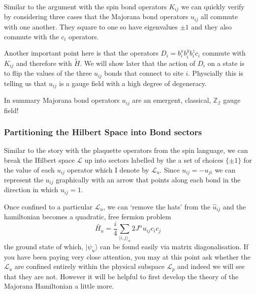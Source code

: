 Similar to the argument with the spin bond operators \(K_{ij}\) we can
quickly verify by considering three cases that the Majorana bond
operators \(u_{ij}\) all commute with one another. They square to one so
have eigenvalues \(\pm 1\) and they also commute with the \(c_i\)
operators.

Another important point here is that the operators
\(D_i = b^x_i b^y_i b^z_i c_i\) commute with \(K_{ij}\) and therefore
with \(\tilde{H}\). We will show later that the action of \(D_i\) on a
state is to flip the values of the three \(u_{ij}\) bonds that connect
to site \(i\). Physcially this is telling us that \(u_{ij}\) is a gauge
field with a high degree of degeneracy.

In summary Majorana bond operators \(u_{ij}\) are an emergent,
classical, \(\mathbb{Z_2}\) gauge field!

\hypertarget{partitioning-the-hilbert-space-into-bond-sectors}{%
\subsubsection{Partitioning the Hilbert Space into Bond
sectors}\label{partitioning-the-hilbert-space-into-bond-sectors}}

Similar to the story with the plaquette operators from the spin
language, we can break the Hilbert space \(\mathcal{L}\) up into sectors
labelled by the a set of choices \(\{\pm 1\}\) for the value of each
\(u_{ij}\) operator which I denote by \(\mathcal{L}_u\). Since
\(u_{ij} = -u_{ji}\) we can represent the \(u_{ij}\) graphically with an
arrow that points along each bond in the direction in which
\(u_{ij} = 1\).

Once confined to a particular \(\mathcal{L}_u\), we can `remove the
hats' from the \(\hat{u}_{ij}\) and the hamiltonian becomes a quadratic,
free fermion problem
\[\tilde{H_u} =  \frac{i}{4} \sum_{\langle i,j\rangle_\alpha} 2J^{\alpha} u_{ij} c_i c_j\]
the ground state of which, \(|\psi_u\rangle\) can be found easily via
matrix diagonalisation. If you have been paying very close attention,
you may at this point ask whether the \(\mathcal{L}_u\) are confined
entirely within the physical subspace \(\mathcal{L}_p\) and indeed we
will see that they are not. However it will be helpful to first develop
the theory of the Majorana Hamiltonian a little more.

